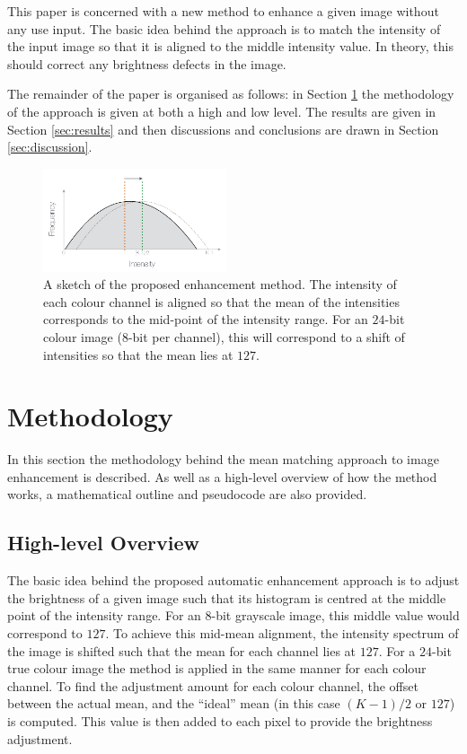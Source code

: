 \documentclass[journal,transmag]{IEEEtran}
\begin{document}
This paper is concerned with a new method to enhance a given image without any use input.  The basic idea behind the approach is to match the intensity of the input image so that it is aligned to the middle intensity value.  In theory, this should correct any brightness defects in the image.

The remainder of the paper is organised as follows: in Section \ref{sec:methods} the methodology of the approach is given at both a high and low level.  The results are given in Section \ref{sec:results} and then discussions and conclusions are drawn in Section \ref{sec:discussion}.

\begin{figure}[b!]
	\centering
	\includegraphics[width=0.48\textwidth]{figures//sketch}
	\caption{A sketch of the proposed enhancement method.  The intensity of each colour channel is aligned so that the mean of the intensities corresponds to the mid-point of the intensity range.  For an $24$-bit colour image ($8$-bit per channel), this will correspond to a shift of intensities so that the mean lies at  $127$.}
	\label{fig:sketch}
\end{figure}

\section{Methodology}
\label{sec:methods}

In this section the methodology behind the mean matching approach to image enhancement is described.  As well as a high-level overview of how the method works, a mathematical outline and pseudocode are also provided.

\subsection{High-level Overview}

The basic idea behind the proposed automatic enhancement approach is to adjust the brightness of a given image such that its histogram is centred at the middle point of the intensity range.  For an 8-bit grayscale image, this middle value would correspond to $127$.  To achieve this mid-mean alignment, the intensity spectrum of the image is shifted such that the mean for each channel lies at $127$.  For a $24$-bit true colour image the method is applied in the same manner for each colour channel.  To find the adjustment amount for each colour channel, the offset between the actual mean, and the ``ideal'' mean (in this case $(K-1)/2$ or $127$) is computed.  This value is then added to each pixel to provide the brightness adjustment.
\end{document}
